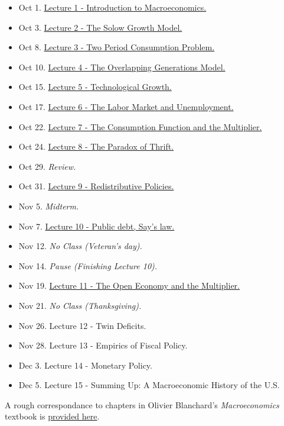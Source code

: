 \documentclass[]{book}
\providecommand{\tightlist}{%
  \setlength{\itemsep}{0pt}\setlength{\parskip}{0pt}}
\theoremstyle{definition}
\theoremstyle{definition}
\theoremstyle{definition}
\theoremstyle{remark}
\begin{document}
\begin{itemize}
\tightlist
\item
  Oct 1. \protect\hyperlink{intro-cobb}{Lecture 1 - Introduction to
  Macroeconomics.}
\item
  Oct 3. \protect\hyperlink{solow}{Lecture 2 - The Solow Growth Model.}
\item
  Oct 8. \protect\hyperlink{two-period}{Lecture 3 - Two Period
  Consumption Problem.}
\item
  Oct 10. \protect\hyperlink{olg}{Lecture 4 - The Overlapping
  Generations Model.}
\item
  Oct 15. \protect\hyperlink{technology}{Lecture 5 - Technological
  Growth.}
\item
  Oct 17. \protect\hyperlink{labor-market}{Lecture 6 - The Labor Market
  and Unemployment.}
\item
  Oct 22. \protect\hyperlink{cons-function}{Lecture 7 - The Consumption
  Function and the Multiplier.}
\item
  Oct 24. \protect\hyperlink{paradox-thrift}{Lecture 8 - The Paradox of
  Thrift.}
\item
  Oct 29. \emph{Review.}
\item
  Oct 31. \protect\hyperlink{redistributive}{Lecture 9 - Redistributive
  Policies.}
\item
  Nov 5. \emph{Midterm.}
\item
  Nov 7. \protect\hyperlink{public-debt}{Lecture 10 - Public debt, Say's
  law.}
\item
  Nov 12. \emph{No Class (Veteran's day).}
\item
  Nov 14. \emph{Pause (Finishing Lecture 10).}
\item
  Nov 19. \protect\hyperlink{open}{Lecture 11 - The Open Economy and the
  Multiplier.}
\item
  Nov 21. \emph{No Class (Thanksgiving).}
\item
  Nov 26. Lecture 12 - Twin Deficits.
\item
  Nov 28. Lecture 13 - Empirics of Fiscal Policy.
\item
  Dec 3. Lecture 14 - Monetary Policy.
\item
  Dec 5. Lecture 15 - Summing Up: A Macroeconomic History of the U.S.
\end{itemize}

A rough correspondance to chapters in Olivier Blanchard's
\emph{Macroeconomics} textbook is
\href{https://docs.google.com/spreadsheets/d/1OQzilQvOLusOsv16pJ3FgFN1YAadELe64jJAV2PEsF0/edit?usp=sharing}{provided
here}.
\end{document}
